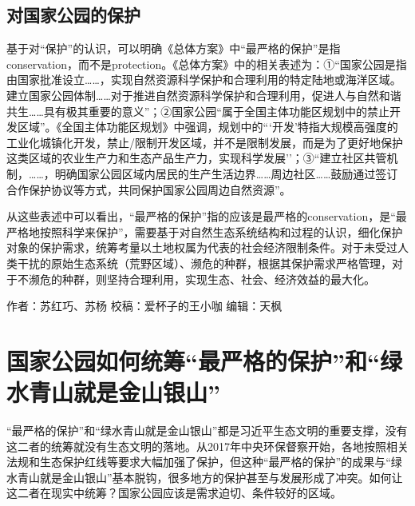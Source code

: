 \documentclass[
]{book}
\begin{document}
\hypertarget{ux5bf9ux56fdux5bb6ux516cux56edux7684ux4fddux62a4}{%
\subsection{对国家公园的保护}\label{ux5bf9ux56fdux5bb6ux516cux56edux7684ux4fddux62a4}}

基于对``保护''的认识，可以明确《总体方案》中``最严格的保护''是指conservation，而不是protection。《总体方案》中的相关表述为：①``国家公园是指由国家批准设立\ldots\ldots，实现自然资源科学保护和合理利用的特定陆地或海洋区域。建立国家公园体制\ldots\ldots 对于推进自然资源科学保护和合理利用，促进人与自然和谐共生\ldots\ldots 具有极其重要的意义''；②国家公园``属于全国主体功能区规划中的禁止开发区域''。《全国主体功能区规划》中强调，规划中的```开发'特指大规模高强度的工业化城镇化开发，禁止/限制开发区域，并不是限制发展，而是为了更好地保护这类区域的农业生产力和生态产品生产力，实现科学发展''；③``建立社区共管机制，\ldots\ldots，明确国家公园区域内居民的生产生活边界\ldots\ldots 周边社区\ldots\ldots 鼓励通过签订合作保护协议等方式，共同保护国家公园周边自然资源''。

从这些表述中可以看出，``最严格的保护''指的应该是最严格的conservation，是``最严格地按照科学来保护''，需要基于对自然生态系统结构和过程的认识，细化保护对象的保护需求，统筹考量以土地权属为代表的社会经济限制条件。对于未受过人类干扰的原始生态系统（荒野区域）、濒危的种群，根据其保护需求严格管理，对于不濒危的种群，则坚持合理利用，实现生态、社会、经济效益的最大化。

作者：苏红巧、苏杨
校稿：爱杯子的王小咖
编辑：天枫

\hypertarget{ux56fdux5bb6ux516cux56edux5982ux4f55ux7edfux7b79ux6700ux4e25ux683cux7684ux4fddux62a4ux548cux7effux6c34ux9752ux5c71ux5c31ux662fux91d1ux5c71ux94f6ux5c71}{%
\section{国家公园如何统筹``最严格的保护''和``绿水青山就是金山银山''}\label{ux56fdux5bb6ux516cux56edux5982ux4f55ux7edfux7b79ux6700ux4e25ux683cux7684ux4fddux62a4ux548cux7effux6c34ux9752ux5c71ux5c31ux662fux91d1ux5c71ux94f6ux5c71}}

``最严格的保护''和``绿水青山就是金山银山''都是习近平生态文明的重要支撑，没有这二者的统筹就没有生态文明的落地。从2017年中央环保督察开始，各地按照相关法规和生态保护红线等要求大幅加强了保护，但这种``最严格的保护''的成果与``绿水青山就是金山银山''基本脱钩，很多地方的保护甚至与发展形成了冲突。如何让这二者在现实中统筹？国家公园应该是需求迫切、条件较好的区域。
\end{document}
